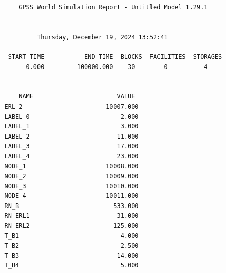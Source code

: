\documentclass{article}
\begin{document}
\begin{lstlisting}
              GPSS World Simulation Report - Untitled Model 1.29.1


                   Thursday, December 19, 2024 13:52:41

           START TIME           END TIME  BLOCKS  FACILITIES  STORAGES
                0.000         100000.000    30        0          4


              NAME                       VALUE
          ERL_2                       10007.000
          LABEL_0                         2.000
          LABEL_1                         3.000
          LABEL_2                        11.000
          LABEL_3                        17.000
          LABEL_4                        23.000
          NODE_1                      10008.000
          NODE_2                      10009.000
          NODE_3                      10010.000
          NODE_4                      10011.000
          RN_B                          533.000
          RN_ERL1                        31.000
          RN_ERL2                       125.000
          T_B1                            4.000
          T_B2                            2.500
          T_B3                           14.000
          T_B4                            5.000



\end{lstlisting}
\end{document}
